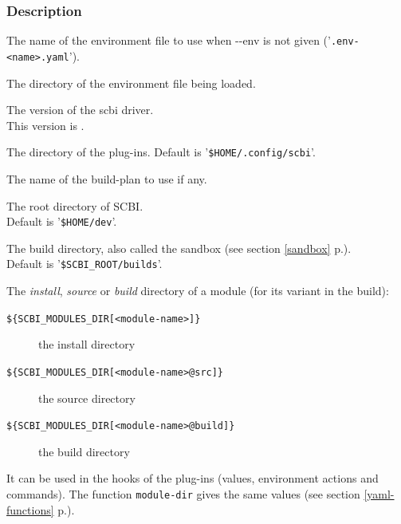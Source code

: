 \documentclass[a4paper,12pt,twoside]{article}
\let\olditem=\item
\def\myitem[#1]{\vspace{10pt}\olditem[#1]}
\newcommand{\code}[1]{\texttt{#1}}
\renewcommand{\emph}[1]{\textit{#1}}
\newcommand{\seeref}[1]{see section \ref{#1} p.\pageref{#1}}
\newcommand{\file}[1]{'{\texttt{#1}}'}
\newcommand{\ddash}{-{}-}
\begin{document}
\subsubsection{Description}

\begin{description}[before=\let\item\myitem]
	\item[SCBI\_DEFAULT\_ENV] The name of the environment file to use when \ddash{}env is not given (\file{.env-<name>.yaml}).

	\item[SCBI\_ENV\_DIR] The directory of the environment file being loaded.

	\item[SCBI\_VERSION] The version of the scbi driver.
	\\This version is \version.

	\item[SCBI\_PLUGINS] The directory of the plug-ins.
	Default is \file{\$HOME/.config/scbi}.

	\item[SCBI\_PLAN] The name of the build-plan to use if any.

	\item[SCBI\_ROOT] The root directory of SCBI. \\
	Default is \file{\$HOME/dev}.

	\item[SCBI\_BDIR] The build directory, also called the sandbox (\seeref{sandbox}). \\
	Default is \file{\$SCBI\_ROOT/builds}.

	\item[SCBI\_MODULES\_DIR{[<module-name>[@src|@build]]}] The \emph{install}, \emph{source} or \emph{build} directory of a module (for its variant in the build):
	
	\begin{description}
		\item[\code{\$\{SCBI\_MODULES\_DIR[<module-name>]\}}] the install directory
		\item[\code{\$\{SCBI\_MODULES\_DIR[<module-name>@src]\}}] the source directory
		\item[\code{\$\{SCBI\_MODULES\_DIR[<module-name>@build]\}}] the build directory
	\end{description}
	It can be used in the hooks of the plug-ins (values, environment actions and commands). The function \code{module-dir} gives the same values (\seeref{yaml-functions}).


\end{description}
\end{document}
